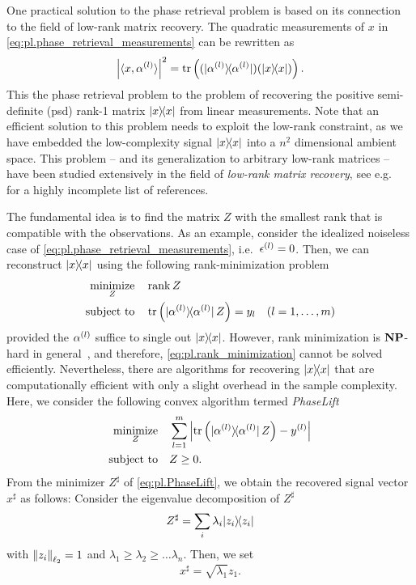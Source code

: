One practical solution to the phase retrieval problem is based on its connection to the field of low-rank matrix recovery.
The quadratic measurements of $x$ in \cref{eq:pl.phase_retrieval_measurements} can be rewritten as
\[
  \left| \langle {x}, \alpha^{(l)} \rangle \right|^2
  = \tr \left( (\ket{\alpha^{(l)}}\bra{\alpha^{(l)}}) (\ket{{x}}\bra{{x}}) \right).
\]
This  the phase retrieval problem to the problem of recovering the positive semi-definite (psd) rank-1 matrix $\ketbra{x}$ from linear measurements.
Note that an efficient solution to this problem needs to exploit the low-rank constraint, as we have embedded the low-complexity signal $\ketbra{x}$ into a $n^2$ dimensional ambient space.
This problem -- and its generalization to arbitrary low-rank matrices -- have been studied extensively in the field of \emph{low-rank matrix recovery}, see e.g.~\cite{Ahmed_2014_Blind,Candes_2009_Exact,Candes_2011_Tight,Recht_2010_Guaranteed,Gross_2011_Recovering,Chen_2015_IncoherenceOptimal} for a highly incomplete list of references.

The fundamental idea is to find the matrix $Z$ with the smallest rank that is compatible with the observations.
As an example, consider the idealized noiseless case of \cref{eq:pl.phase_retrieval_measurements}, i.e.\ $\epsilon^{(l)} = 0$.
Then, we can reconstruct $\ketbra{x}$ using the following rank-minimization problem
\[
  \begin{split}
    \underset{{Z}}{\textrm{minimize}} &\quad \rank Z \\
    \textrm{subject to} &\quad  \tr\left( \ketbra{\alpha\ind{l}} \, Z \right) = y_l \quad (l=1,\ldots,m)
  \end{split}
  \label{eq:pl.rank_minimization}
\]
provided the $\alpha^{(l)}$ suffice to single out $\ketbra{x}$.
However, rank minimization is $\mathbf{NP}$-hard in general~\cite{Boyd_2004_Convex}, and therefore, \cref{eq:pl.rank_minimization} cannot be solved efficiently.
Nevertheless, there are algorithms for recovering $\ketbra{x}$ that are computationally efficient with only a slight overhead in the sample complexity.
Here, we consider the following convex algorithm termed \emph{PhaseLift}~\cite{Candes_2013_Phaselift}
\[
  \label{eq:pl.PhaseLift}
  \begin{split}
    \underset{{Z}}{\textrm{minimize}} & \quad \sum_{l=1}^m \left| \tr \left( \ket{\alpha^{(l)}} \bra{\alpha^{(l)}} \, {Z} \right) - y^{(l)} \right| \\
    \textrm{subject to} &\quad  {Z} \geq 0.
  \end{split}
\]
From the minimizer $Z^\sharp$ of \cref{eq:pl.PhaseLift}, we obtain the recovered signal vector ${ x}^\sharp$ as follows:
Consider the eigenvalue decomposition of $Z^\sharp$
\[
  Z^\sharp = \sum_i \lambda_i \ketbra{z_i}
\]
with ${\Vert z_i\Vert}_{\ell_2} = 1$ and $\lambda_1 \ge \lambda_2 \ge \ldots \lambda_n$.
Then, we set
\[
  x^\sharp = \sqrt{\lambda_1} z_1.
  \label{eq:pl.vector_from_matrix}
\]

